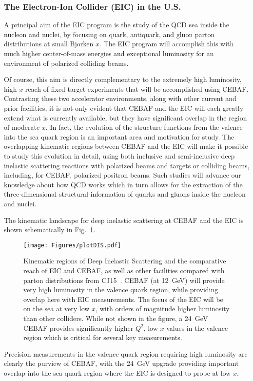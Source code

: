 \subsubsection{The Electron-Ion Collider (EIC) in the U.S.}

A principal aim of the EIC program is the study of the QCD sea inside the nucleon and nuclei, by focusing on quark, antiquark, and gluon parton distributions at small Bjorken $x$. The EIC program will accomplish this with much higher center-of-mass energies and exceptional luminosity for an environment of polarized colliding beams.

Of course, this aim is directly complementary to the extremely high luminosity, high $x$ reach of fixed target experiments that will be accomplished using CEBAF.
Contrasting these two accelerator environments, along with other current and prior facilities, it is not only evident that CEBAF and the EIC will each greatly extend  what is currently available, but they have significant overlap in the region of moderate $x$. In fact, the evolution of the structure functions from the valence into the sea quark region is an important area and motivation for study. The overlapping kinematic regions between CEBAF and the EIC will make it possible to study this evolution in detail, using both inclusive and semi-inclusive deep inelastic scattering reactions with polarized beams and targets or colliding beams, including, for CEBAF, polarized positron beams. Such studies will advance our knowledge about how QCD works which in turn allows for the extraction of the three-dimensional structural information of quarks and gluons inside the nucleon and nuclei.

The kinematic landscape for deep inelastic scattering at CEBAF and the EIC is shown schematically in Fig.~\ref{fig:CEBAFvsEIC}.
\begin{figure}[t]
\begin{center}
\texttt{[image: Figures/plotDIS.pdf]}
\caption{Kinematic regions of Deep Inelastic Scattering and the comparative reach of EIC and CEBAF, as well as other facilities compared with parton distributions from CJ15~\cite{Accardi:2016qay}. CEBAF (at 12~GeV) will provide very high luminosity in the valence quark region, while providing overlap here with EIC measurements. The focus of the EIC will be on the sea at very low $x$, with orders of magnitude higher luminosity than other colliders. While not shown in the figure, a 24~GeV CEBAF provides significantly higher $Q^2$, low $x$ values in the valence region which is critical for several key measurements.}
\label{fig:CEBAFvsEIC} 
\end{center}
\end{figure}
Precision measurements in the valence quark region requiring high luminosity are clearly the purview of CEBAF, with the 24~GeV upgrade providing important overlap into the sea quark region where the EIC is designed to probe at low $x$.

